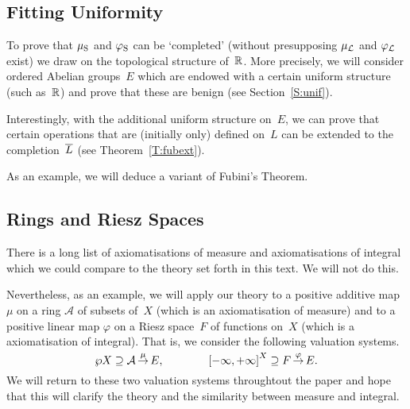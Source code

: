 \documentclass[main.tex]{subfiles}
\begin{document}
\subsection{Fitting Uniformity}
To prove that $\mu_{\mathrm{S}}$ and $\varphi_{\mathrm{S}}$
can be `completed'
(without presupposing $\mu_{\mathcal{L}}$ and $\varphi_{\mathcal{L}}$ exist)
we draw on the topological structure of~$\mathbb{R}$.
More precisely,
we will consider ordered Abelian groups~$E$
which are endowed with a certain uniform structure
(such as~$\mathbb{R}$) and prove
that these are benign (see Section~\ref{S:unif}).

Interestingly,
with the additional uniform structure on~$E$,
we can prove that certain operations
that are (initially only) defined on~$L$
can be extended to the completion~$\overline{L}$
(see Theorem~\ref{T:fubext}).

As an example,
we will deduce a variant of Fubini's Theorem.

\subsection{Rings and Riesz Spaces}
There is a long list of axiomatisations of measure and
axiomatisations of integral
which we could compare to the theory set forth in this text.
We will not do this.

Nevertheless,
as an example,
we will apply our theory
to a positive additive map $\mu$ on a ring $\mathcal{A}$ of
subsets of~$X$
(which is an axiomatisation of measure)
and 
to a positive linear 
map $\varphi$ on a Riesz space~$F$ of functions on~$X$
(which is a axiomatisation of integral).
That is,
we consider the following valuation systems.
\begin{equation*}
\wp X \supseteq \mathcal{A}\,\smash{\stackrel{\mu}{\rightarrow}}\,E,
\qquad\qquad
\smash{{[-\infty,+\infty]}^X} \supseteq F\,\smash{\stackrel{\varphi}{\rightarrow}}\,E.
\end{equation*}
We will return to these two valuation systems throughtout the paper
and hope that this will clarify the theory
and the similarity between measure and integral.
\end{document}
